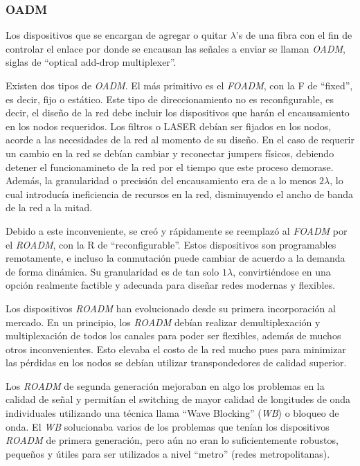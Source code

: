 
\subsubsection{OADM}
\label{sec:oadm}

Los dispositivos que se encargan de agregar o quitar $\lambda$'s de
una fibra con el fin de controlar el enlace por donde se encausan las
señales a enviar se llaman \emph{OADM}, siglas de ``optical add-drop
multiplexer''.

Existen dos tipos de \emph{OADM}. El más primitivo es el \emph{FOADM},
con la F de ``fixed'', es decir, fijo o estático. Este tipo de
direccionamiento no es reconfigurable, es decir, el diseño de la red
debe incluir los dispositivos que harán el encausamiento en los nodos
requeridos. Los filtros o LASER debían ser fijados en los nodos,
acorde a las necesidades de la red al momento de su diseño. En el caso
de requerir un cambio en la red se debían cambiar y reconectar jumpers
físicos, debiendo detener el funcionamineto de la red por el tiempo
que este proceso demorase. Además, la granularidad o precisión del
encausamiento era de a lo menos $2\lambda$, lo cual introducía
ineficiencia de recursos en la red, disminuyendo el ancho de banda de
la red a la mitad.

Debido a este inconveniente, se creó y rápidamente se reemplazó al
\emph{FOADM} por el \emph{ROADM}, con la R de
``reconfigurable''. Estos dispositivos son programables remotamente, e
incluso la conmutación puede cambiar de acuerdo a la demanda de forma
dinámica. Su granularidad es de tan solo $1\lambda$, convirtiéndose en
una opción realmente factible y adecuada para diseñar redes modernas y
flexibles.

Los dispositivos \emph{ROADM} han evolucionado desde su primera
incorporación al mercado. En un principio, los \emph{ROADM} debían
realizar demultiplexación y multiplexación de todos los canales para
poder ser flexibles, además de muchos otros inconvenientes. Esto
elevaba el costo de la red mucho pues para minimizar las pérdidas en
los nodos se debían utilizar transpondedores de calidad superior.

Los \emph{ROADM} de segunda generación mejoraban en algo los problemas
en la calidad de señal y permitían el switching de mayor calidad de
longitudes de onda individuales utilizando una técnica llama ``Wave
Blocking'' (\emph{WB}) o bloqueo de onda. El \emph{WB} solucionaba
varios de los problemas que tenían los dispositivos \emph{ROADM} de
primera generación, pero aún no eran lo suficientemente robustos,
pequeños y útiles para ser utilizados a nivel ``metro'' (redes
metropolitanas).


